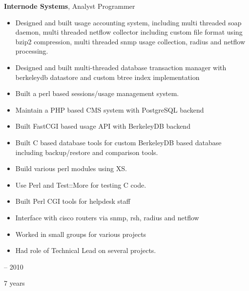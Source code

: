 \documentclass[12pt, a4paper]{article}
\newenvironment{highlights}{
    \begin{itemize}[
        topsep=0.10 cm,
        parsep=0.10 cm,
        partopsep=0pt,
        itemsep=0pt,
        leftmargin=0.4 cm + 10pt
    ]
}{
    \end{itemize}
} %
\newenvironment{twocolentry}[2][]{
    \onecolentry
    \def\secondColumn{#2}
    \setcolumnwidth{\fill, 4.5 cm}
    \begin{paracol}{2}
}{
    \switchcolumn \raggedleft \secondColumn
    \end{paracol}
    \endonecolentry
} %
\begin{document}
        \begin{twocolentry}{
            2003 – 2010

        7 years
        }
            \textbf{Internode Systems}, Analyst Programmer
            \begin{highlights}
                \item Designed and built usage accounting system, including multi threaded soap daemon, multi threaded netflow collector including custom file format using bzip2 compression, multi threaded snmp usage collection, radius and netflow processing.
                \item Designed and built multi-threaded database transaction manager with berkeleydb datastore and custom btree index implementation
                \item Built a perl based sessions/usage management system.
                \item Maintain a PHP based CMS system with PostgreSQL backend
                \item Built FastCGI based usage API with BerkeleyDB backend
                \item Built C based database tools for custom BerkeleyDB based database including backup/restore and comparison tools.
                \item Build various perl modules using XS.
                \item Use Perl and Test::More for testing C code.
                \item Built Perl CGI tools for helpdesk staff
                \item Interface with cisco routers via snmp, rsh, radius and netflow
                \item Worked in small groups for various projects
                \item Had role of Technical Lead on several projects.
            \end{highlights}
        \end{twocolentry}


        \vspace{0.2 cm}
\end{document}
